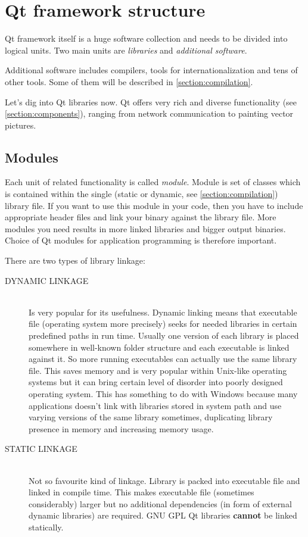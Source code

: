 \section{Qt framework structure}\label{section:qtstructure}
Qt framework itself is a huge software collection and needs to be divided into logical units. Two main units are \textit{libraries} and \textit{additional software}.

Additional software includes compilers, tools for internationalization and tens of other tools. Some of them will be described in \autoref{section:compilation}.

Let's dig into Qt libraries now. Qt offers very rich and diverse functionality (see \autoref{section:components}), ranging from network communication to painting vector pictures.

\subsection{Modules}
Each unit of related functionality is called \textit{module}. Module is set of classes which is contained within the single (static or dynamic, see \autoref{section:compilation}) library file. If you want to use this module in your code, then you have to include appropriate header files and link your binary against the library file. More modules you need results in more linked libraries and bigger output binaries. Choice of Qt modules for application programming is therefore important.

\begin{fdocextra}
There are two types of library linkage:
\begin{description}
\item[DYNAMIC LINKAGE] \hfill \\
Is very popular for its usefulness. Dynamic linking means that executable file (operating system more precisely) seeks for needed libraries in certain predefined paths in run time. Usually one version of each library is placed somewhere in well-known folder structure and each executable is linked against it. So more running executables can actually use the same library file. This saves memory and is very popular within Unix-like operating systems but it can bring certain level of disorder into poorly designed operating system. This has something to do with Windows because many applications doesn't link with libraries stored in system path and use varying versions of the same library sometimes, duplicating library presence in memory and increasing memory usage.
\item[STATIC LINKAGE] \hfill \\
Not so favourite kind of linkage. Library is packed into executable file and linked in compile time. This makes executable file (sometimes considerably) larger but no additional dependencies (in form of external dynamic libraries) are required. GNU GPL Qt libraries \textbf{cannot} be linked statically.
\end{description}
\end{fdocextra}


